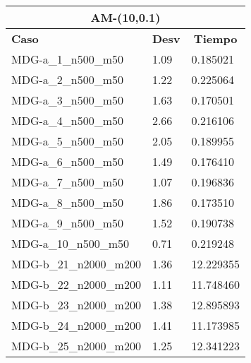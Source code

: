 \documentclass[10pt,a4paper]{article}
\begin{document}
\begin{table}[]
	\centering
	\begin{tabular}{|l|l|l|}
		\hline
		\multicolumn{3}{|c|}{\textbf{AM-(10,0.1)}}                                                                 \\ \hline
		\textbf{Caso}          & \multicolumn{1}{c|}{\textbf{Desv}} & \multicolumn{1}{c|}{\textbf{Tiempo}} \\ \hline
		MDG-a\_1\_n500\_m50    & 1.09                               & 0.185021                             \\ \hline
		MDG-a\_2\_n500\_m50    & 1.22                               & 0.225064                             \\ \hline
		MDG-a\_3\_n500\_m50    & 1.63                               & 0.170501                             \\ \hline
		MDG-a\_4\_n500\_m50    & 2.66                               & 0.216106                             \\ \hline
		MDG-a\_5\_n500\_m50    & 2.05                               & 0.189955                             \\ \hline
		MDG-a\_6\_n500\_m50    & 1.49                               & 0.176410                             \\ \hline
		MDG-a\_7\_n500\_m50    & 1.07                               & 0.196836                             \\ \hline
		MDG-a\_8\_n500\_m50    & 1.86                               & 0.173510                             \\ \hline
		MDG-a\_9\_n500\_m50    & 1.52                               & 0.190738                             \\ \hline
		MDG-a\_10\_n500\_m50   & 0.71                               & 0.219248                             \\ \hline
		MDG-b\_21\_n2000\_m200 & 1.36                               & 12.229355                            \\ \hline
		MDG-b\_22\_n2000\_m200 & 1.11                               & 11.748460                            \\ \hline
		MDG-b\_23\_n2000\_m200 & 1.38                               & 12.895893                            \\ \hline
		MDG-b\_24\_n2000\_m200 & 1.41                               & 11.173985                            \\ \hline
		MDG-b\_25\_n2000\_m200 & 1.25                               & 12.341223                            \\ \hline

\end{tabular}
\end{table}
\end{document}
